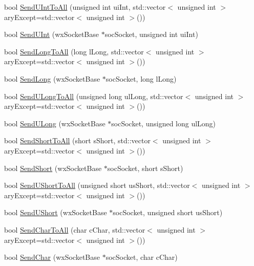 \begin{DoxyCompactItemize}
\item 
bool \hyperlink{classs13_w_x_w_server_a228577626e26129c7c4e20b381756b0a}{Send\+U\+Int\+To\+All} (unsigned int ui\+Int, std\+::vector$<$ unsigned int $>$ ary\+Except=std\+::vector$<$ unsigned int $>$())
\item 
bool \hyperlink{classs13_w_x_w_server_ab73617d998528019111ccc8d8034c511}{Send\+U\+Int} (wx\+Socket\+Base $\ast$soc\+Socket, unsigned int ui\+Int)
\item 
bool \hyperlink{classs13_w_x_w_server_a8e3119f23b74f008c63a2677cd8c78c7}{Send\+Long\+To\+All} (long l\+Long, std\+::vector$<$ unsigned int $>$ ary\+Except=std\+::vector$<$ unsigned int $>$())
\item 
bool \hyperlink{classs13_w_x_w_server_a63d8940cb5a6839fa9b7d76c454e3508}{Send\+Long} (wx\+Socket\+Base $\ast$soc\+Socket, long l\+Long)
\item 
bool \hyperlink{classs13_w_x_w_server_a94d19be2b2055fe09a9dc4753bb2f636}{Send\+U\+Long\+To\+All} (unsigned long ul\+Long, std\+::vector$<$ unsigned int $>$ ary\+Except=std\+::vector$<$ unsigned int $>$())
\item 
bool \hyperlink{classs13_w_x_w_server_a658df0da6858f1263549091e79121182}{Send\+U\+Long} (wx\+Socket\+Base $\ast$soc\+Socket, unsigned long ul\+Long)
\item 
bool \hyperlink{classs13_w_x_w_server_ad3587632e547a7fdedcae2f8b60ba7da}{Send\+Short\+To\+All} (short s\+Short, std\+::vector$<$ unsigned int $>$ ary\+Except=std\+::vector$<$ unsigned int $>$())
\item 
bool \hyperlink{classs13_w_x_w_server_ab17c93aca2f70f8ec92010347d51d28f}{Send\+Short} (wx\+Socket\+Base $\ast$soc\+Socket, short s\+Short)
\item 
bool \hyperlink{classs13_w_x_w_server_a2e487e2f74e67a722895f437f4910aa2}{Send\+U\+Short\+To\+All} (unsigned short us\+Short, std\+::vector$<$ unsigned int $>$ ary\+Except=std\+::vector$<$ unsigned int $>$())
\item 
bool \hyperlink{classs13_w_x_w_server_a52d9c0b576571b7d9d89534601d4cb53}{Send\+U\+Short} (wx\+Socket\+Base $\ast$soc\+Socket, unsigned short us\+Short)
\item 
bool \hyperlink{classs13_w_x_w_server_a653c8fbcf940829b1e97079dfab4fe77}{Send\+Char\+To\+All} (char c\+Char, std\+::vector$<$ unsigned int $>$ ary\+Except=std\+::vector$<$ unsigned int $>$())
\item 
bool \hyperlink{classs13_w_x_w_server_a3fd3d636095b0288090babed4561cbff}{Send\+Char} (wx\+Socket\+Base $\ast$soc\+Socket, char c\+Char)

\end{DoxyCompactItemize}
